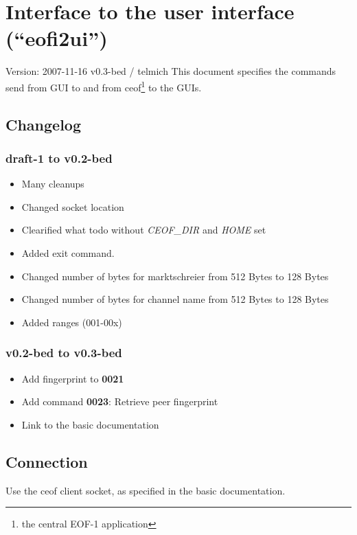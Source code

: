 \documentclass[12pt,a4paper]{book}
\begin{document}
\section{Interface to the user interface ("`eofi2ui"')}

Version: 2007-11-16 v0.3-bed / telmich
This document specifies the commands send from GUI to and from
ceof\footnote{the central EOF-1 application} to the GUIs.
\subsection{Changelog}
\subsubsection{draft-1 to v0.2-bed}
\begin{itemize}
\item Many cleanups
\item Changed socket location
\item Clearified what todo without \textit{CEOF\_DIR} and \textit{HOME} set
\item Added exit command.
\item Changed number of bytes for marktschreier from 512 Bytes to 128 Bytes
\item Changed number of bytes for channel name  from 512 Bytes to 128 Bytes
\item Added ranges (001-00x)
\end{itemize}
\subsubsection{v0.2-bed to v0.3-bed}
\begin{itemize}
\item Add fingerprint to \textbf{0021}
\item Add command \textbf{0023}: Retrieve peer fingerprint
\item Link to the basic documentation
\end{itemize}
\subsection{Connection}
Use the ceof client socket, as specified in the basic documentation.
\end{document}
